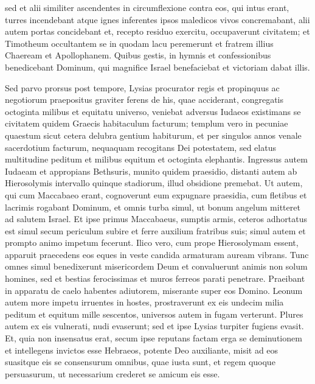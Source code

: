 \begin{biblechapter}
\begin{biblechapter}
\begin{biblechapter}
\begin{biblechapter}
\begin{biblechapter}
\begin{biblechapter}
\begin{biblechapter}
\begin{biblechapter}
\begin{biblechapter}
\begin{biblechapter}
\verse sed et alii similiter ascendentes in circumflexione contra eos, qui intus erant, turres incendebant atque ignes inferentes ipsos maledicos vivos concremabant, alii autem portas concidebant et, recepto residuo exercitu, occupaverunt civitatem; 
\verse et Timotheum occultantem se in quodam lacu peremerunt et fratrem illius Chaeream et Apollophanem. 
\verse Quibus gestis, in hymnis et confessionibus benedicebant Dominum, qui magnifice Israel benefaciebat et victoriam dabat illis.
 
\begin{biblechapter}
\verse Sed parvo prorsus post tempore, Lysias procurator regis et propinquus ac negotiorum praepositus graviter ferens de his, quae acciderant, 
\verse congregatis octoginta milibus et equitatu universo, veniebat adversus Iudaeos existimans se civitatem quidem Graecis habitaculum facturum; 
\verse templum vero in pecuniae quaestum sicut cetera delubra gentium habiturum, et per singulos annos venale sacerdotium facturum, 
\verse nequaquam recogitans Dei potestatem, sed elatus multitudine peditum et milibus equitum et octoginta elephantis. 
\verse Ingressus autem Iudaeam et appropians Bethsuris, munito quidem praesidio, distanti autem ab Hierosolymis intervallo quinque stadiorum, illud obsidione premebat. 
\verse Ut autem, qui cum Maccabaeo erant, cognoverunt eum expugnare praesidia, cum fletibus et lacrimis rogabant Dominum, et omnis turba simul, ut bonum angelum mitteret ad salutem Israel. 
\verse Et ipse primus Maccabaeus, sumptis armis, ceteros adhortatus est simul secum periculum subire et ferre auxilium fratribus suis; simul autem et prompto animo impetum fecerunt. 
\verse Ilico vero, cum prope Hierosolymam essent, apparuit praecedens eos eques in veste candida armaturam auream vibrans. 
\verse Tunc omnes simul benedixerunt misericordem Deum et convaluerunt animis non solum homines, sed et bestias ferocissimas et muros ferreos parati penetrare. 
\verse Praeibant in apparatu de caelo habentes adiutorem, miserante super eos Domino. 
\verse Leonum autem more impetu irruentes in hostes, prostraverunt ex eis undecim milia peditum et equitum mille sescentos, universos autem in fugam verterunt. 
\verse Plures autem ex eis vulnerati, nudi evaserunt; sed et ipse Lysias turpiter fugiens evasit.
 \verse Et, quia non insensatus erat, secum ipse reputans factam erga se deminutionem et intellegens invictos esse Hebraeos, potente Deo auxiliante, misit ad eos 
 \verse suasitque eis se consensurum omnibus, quae iusta sunt, et regem quoque persuasurum, ut necessarium crederet se amicum eis esse. 

\end{biblechapter}
\end{biblechapter}
\end{biblechapter}
\end{biblechapter}
\end{biblechapter}
\end{biblechapter}
\end{biblechapter}
\end{biblechapter}
\end{biblechapter}
\end{biblechapter}
\end{biblechapter}
